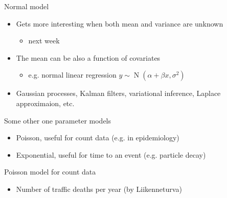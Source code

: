 \documentclass[english,t]{beamer}
\DeclareMathOperator{\N}{N}
\begin{document}
\begin{frame}{Normal model}

  \begin{itemize}
  \item Gets more interesting when both mean and variance are unknown
    \begin{itemize}
    \item next week
    \end{itemize}
  \item<2-> The mean can be also a function of covariates
    \begin{itemize}
    \item e.g. normal linear regression $y \sim \N(\alpha + \beta x, \sigma^2)$
    \end{itemize}
  \item<3-> Gaussian processes, Kalman filters, variational
    inference, Laplace approximaion, etc.
  \end{itemize}
\end{frame}

\begin{frame}{Some other one parameter models}

  \begin{itemize}
  \item Poisson, useful for count data (e.g. in epidemiology)
  \item Exponential, useful for time to an event (e.g. particle decay)
  \end{itemize}
  
\end{frame}

\begin{frame}{Poisson model for count data}

  \begin{itemize}
  \item Number of traffic deaths per year (by Liikenneturva)
  \end{itemize}

  \vspace{\baselineskip}
  
  
\end{frame}
\end{document}
